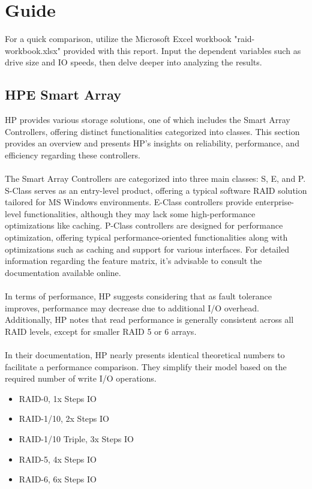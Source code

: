 \documentclass{article}
\begin{document}
\section{Guide}
For a quick comparison, utilize the Microsoft Excel 
workbook "raid-workbook.xlsx" provided with this report.
Input the dependent variables such as drive size and IO speeds, 
then delve deeper into analyzing the results. \cite{mas:workbook}
\subsection{HPE Smart Array}
HP provides various storage solutions, one of which includes the Smart Array Controllers,
offering distinct functionalities categorized into classes.
This section provides an overview and presents HP's insights on reliability, performance, and efficiency regarding these controllers.
\\ \\
The Smart Array Controllers are categorized into three main classes: S, E, and P.
S-Class serves as an entry-level product, offering a typical software RAID solution tailored for MS Windows environments.
E-Class controllers provide enterprise-level functionalities, although they may lack some high-performance optimizations like caching.
P-Class controllers are designed for performance optimization, 
offering typical performance-oriented functionalities along with optimizations such as caching and support for various interfaces.
For detailed information regarding the feature matrix, it's advisable to consult the documentation available online. \cite{hpe:sa-userguide}
\\ \\
In terms of performance, HP suggests considering that as fault tolerance improves, performance may decrease due to additional I/O overhead.
Additionally, HP notes that read performance is generally consistent across all RAID levels, except for smaller RAID 5 or 6 arrays. \cite{hpe:sa-userguide}
\\ \\
In their documentation, HP nearly presents identical theoretical numbers to facilitate a performance comparison.
They simplify their model based on the required number of write I/O operations.
\begin{itemize}
    \item RAID-0, 1x Steps IO 
    \item RAID-1/10, 2x Steps IO
    \item RAID-1/10 Triple, 3x Steps IO
    \item RAID-5, 4x Steps IO
    \item RAID-6, 6x Steps IO
\end{itemize}
\end{document}
